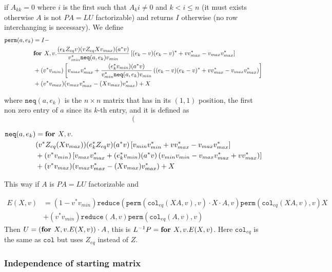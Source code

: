 if $A_{kk}=0$ where $i$ is the first such that $A_ki\neq 0$ and $k<i\leq n$ (it must exists otherwise $A$ is not $PA=LU$ factorizable) and returns $I$ otherwise (no row interchanging is necessary). We define
\begin{align*}
\texttt{perm}(a,e_k)&=I - \\
 &\textbf{for } X,v. \dfrac{(e_kZ_{eq}v)(vZ_{eq}Xv_{max})(a^*v)}{v_{min}^*\texttt{neq}(a, e_k)v_{min}}\left[ (e_k-v)(e_k-v)^*+vv_{max}^*-v_{max}v_{max}^*\right] \\
 & + (v^*v_{min})\left[  v_{max}v_{max}^* + \dfrac{(e_k^*v_{min})(a^*v)}{v_{min}^*\texttt{neq}(a, e_k)v_{min}}\left( (e_k-v)(e_k-v)^* + vv_{max}^* - v_{max}v_{max}^* \right) \right] \\
 & + (v^*v_{max})(v_{max}v_{max}^*-(Xv_{max})v_{max}^*) + X
\end{align*}

where $\texttt{neq}(a, e_k)$ is the $n\times n$ matrix that has in its $(1,1)$ position, the first non zero entry of $a$  since its $k$-th entry, and it is defined as $$ ( $$

\begin{align*}
\texttt{neq}(a, e_k)&=\textbf{for } X,v. \\
&(v^*Z_{eq}(Xv_{max}))(e_k^*Z_{eq}v)(a^*v)\left[ v_{min}v_{min}^* + vv_{max}^*-v_{max}v_{max}^* \right] \\
&+ (v^*v_{min})\left[ v_{max}v_{max}^* + (e_k^*v_{min})(a^*v)\left( v_{min}v_{min} - v_{max}v_{max}^* + vv_{max}^* \right)\right] \\
 & + (v^*v_{max})(v_{max}v_{max}^*-(Xv_{max})v_{max}^*) + X
\end{align*}

This way if $A$ is $PA=LU$ factorizable and 

\begin{align*}
	E(X, v)&=(1-v^*v_{min})\texttt{reduce}(\texttt{perm}(\texttt{col}_{eq}(XA,v),v) \cdot X \cdot A,v) \texttt{perm}(\texttt{col}_{eq}(XA,v),v)X \\
	&+ (v^*v_{min})\texttt{reduce}(A,v)\texttt{perm}(\texttt{col}_{eq}(A,v),v)
\end{align*}
Then $U=(\textbf{for } X, v.E(X,v))\cdot A$, this is $L^{-1}P=\textbf{for } X, v.E(X,v)$. Here $\texttt{col}_{eq}$ is the same as $\texttt{col}$ but uses $Z_{eq}$ instead of $Z$.

\subsubsection{Independence of starting matrix}

